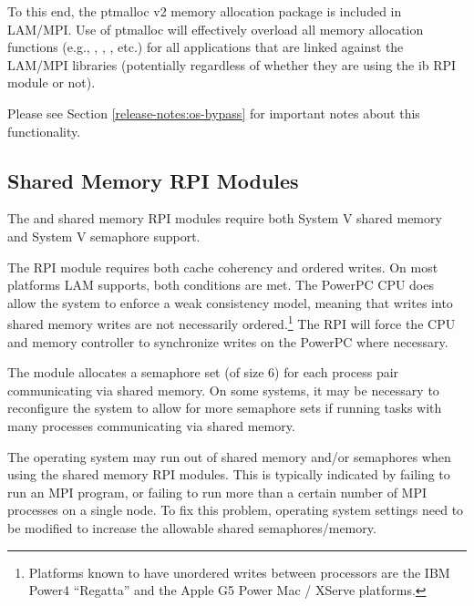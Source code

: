 To this end, the ptmalloc v2 memory allocation package is included in
LAM/MPI.  Use of ptmalloc will effectively overload all memory
allocation functions (e.g., , ,
, etc.) for all applications that are linked against the
LAM/MPI libraries (potentially regardless of whether they are using
the ib RPI module or not).

Please see Section \ref{release-notes:os-bypass} for important notes
about this functionality.



\subsection{Shared Memory RPI Modules}
\label{sec:requirements-shared-memory}

The  and  shared memory RPI modules require both
System V shared memory and System V semaphore support.


The  RPI module requires both cache coherency and ordered
writes.  On most platforms LAM supports, both conditions are met.  The
PowerPC CPU does allow the system to enforce a weak consistency model,
meaning that writes into shared memory writes are not necessarily
ordered.\footnote{Platforms known to have unordered writes between
  processors are the IBM Power4 ``Regatta'' and the Apple G5 Power Mac
  / XServe platforms.}  The  RPI will force the CPU and
memory controller to synchronize writes on the PowerPC where
necessary.


The  module allocates a semaphore set (of size 6) for each
process pair communicating via shared memory.  On some systems, it may
be necessary to reconfigure the system to allow for more semaphore
sets if running tasks with many processes communicating via shared
memory.

The operating system may run out of shared memory and/or semaphores
when using the shared memory RPI modules.  This is typically indicated
by failing to run an MPI program, or failing to run more than a
certain number of MPI processes on a single node.  To fix this
problem,  operating system settings need to be modified to
increase the allowable shared semaphores/memory.

